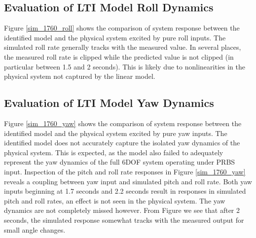 \subsection{Evaluation of LTI Model Roll Dynamics}
Figure \ref{sim_1760_roll} shows the comparison of system response between the identified model and the physical system excited by pure roll inputs. The simulated roll rate generally tracks with the measured value. In several places, the measured roll rate is clipped while the predicted value is not clipped (in particular between 1.5 and 2 seconds). This is likely due to nonlinearities in the physical system not captured by the linear model.


\subsection{Evaluation of LTI Model Yaw Dynamics}
Figure \ref{sim_1760_yaw} shows the comparison of system response between the identified model and the physical system excited by pure yaw inputs. The identified model does not accurately capture the isolated yaw dynamics of the physical system. This is expected, as the model also failed to adequately represent the yaw dynamics of the full 6DOF system operating under PRBS input. Inspection of the pitch and roll rate responses in Figure \ref{sim_1760_yaw} reveals a coupling between yaw input and simulated pitch and roll rate. Both yaw inputs beginning at 1.7 seconds and 2.2 seconds result in responses in simulated pitch and roll rates, an effect is not seen in the physical system. The yaw dynamics are not completely missed however. From Figure \label{sim_1760_20131017212626_31_38500} we see that after 2 seconds, the simulated response somewhat tracks with the measured output for small angle changes.







